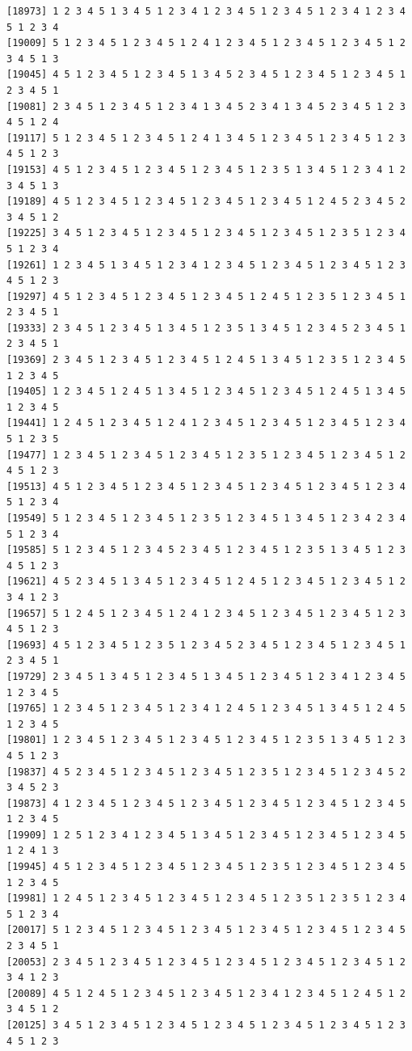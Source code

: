 \documentclass[
  english,
]{book}
\begin{document}
\begin{verbatim}
[18973] 1 2 3 4 5 1 3 4 5 1 2 3 4 1 2 3 4 5 1 2 3 4 5 1 2 3 4 1 2 3 4 5 1 2 3 4
[19009] 5 1 2 3 4 5 1 2 3 4 5 1 2 4 1 2 3 4 5 1 2 3 4 5 1 2 3 4 5 1 2 3 4 5 1 3
[19045] 4 5 1 2 3 4 5 1 2 3 4 5 1 3 4 5 2 3 4 5 1 2 3 4 5 1 2 3 4 5 1 2 3 4 5 1
[19081] 2 3 4 5 1 2 3 4 5 1 2 3 4 1 3 4 5 2 3 4 1 3 4 5 2 3 4 5 1 2 3 4 5 1 2 4
[19117] 5 1 2 3 4 5 1 2 3 4 5 1 2 4 1 3 4 5 1 2 3 4 5 1 2 3 4 5 1 2 3 4 5 1 2 3
[19153] 4 5 1 2 3 4 5 1 2 3 4 5 1 2 3 4 5 1 2 3 5 1 3 4 5 1 2 3 4 1 2 3 4 5 1 3
[19189] 4 5 1 2 3 4 5 1 2 3 4 5 1 2 3 4 5 1 2 3 4 5 1 2 4 5 2 3 4 5 2 3 4 5 1 2
[19225] 3 4 5 1 2 3 4 5 1 2 3 4 5 1 2 3 4 5 1 2 3 4 5 1 2 3 5 1 2 3 4 5 1 2 3 4
[19261] 1 2 3 4 5 1 3 4 5 1 2 3 4 1 2 3 4 5 1 2 3 4 5 1 2 3 4 5 1 2 3 4 5 1 2 3
[19297] 4 5 1 2 3 4 5 1 2 3 4 5 1 2 3 4 5 1 2 4 5 1 2 3 5 1 2 3 4 5 1 2 3 4 5 1
[19333] 2 3 4 5 1 2 3 4 5 1 3 4 5 1 2 3 5 1 3 4 5 1 2 3 4 5 2 3 4 5 1 2 3 4 5 1
[19369] 2 3 4 5 1 2 3 4 5 1 2 3 4 5 1 2 4 5 1 3 4 5 1 2 3 5 1 2 3 4 5 1 2 3 4 5
[19405] 1 2 3 4 5 1 2 4 5 1 3 4 5 1 2 3 4 5 1 2 3 4 5 1 2 4 5 1 3 4 5 1 2 3 4 5
[19441] 1 2 4 5 1 2 3 4 5 1 2 4 1 2 3 4 5 1 2 3 4 5 1 2 3 4 5 1 2 3 4 5 1 2 3 5
[19477] 1 2 3 4 5 1 2 3 4 5 1 2 3 4 5 1 2 3 5 1 2 3 4 5 1 2 3 4 5 1 2 4 5 1 2 3
[19513] 4 5 1 2 3 4 5 1 2 3 4 5 1 2 3 4 5 1 2 3 4 5 1 2 3 4 5 1 2 3 4 5 1 2 3 4
[19549] 5 1 2 3 4 5 1 2 3 4 5 1 2 3 5 1 2 3 4 5 1 3 4 5 1 2 3 4 2 3 4 5 1 2 3 4
[19585] 5 1 2 3 4 5 1 2 3 4 5 2 3 4 5 1 2 3 4 5 1 2 3 5 1 3 4 5 1 2 3 4 5 1 2 3
[19621] 4 5 2 3 4 5 1 3 4 5 1 2 3 4 5 1 2 4 5 1 2 3 4 5 1 2 3 4 5 1 2 3 4 1 2 3
[19657] 5 1 2 4 5 1 2 3 4 5 1 2 4 1 2 3 4 5 1 2 3 4 5 1 2 3 4 5 1 2 3 4 5 1 2 3
[19693] 4 5 1 2 3 4 5 1 2 3 5 1 2 3 4 5 2 3 4 5 1 2 3 4 5 1 2 3 4 5 1 2 3 4 5 1
[19729] 2 3 4 5 1 3 4 5 1 2 3 4 5 1 3 4 5 1 2 3 4 5 1 2 3 4 1 2 3 4 5 1 2 3 4 5
[19765] 1 2 3 4 5 1 2 3 4 5 1 2 3 4 1 2 4 5 1 2 3 4 5 1 3 4 5 1 2 4 5 1 2 3 4 5
[19801] 1 2 3 4 5 1 2 3 4 5 1 2 3 4 5 1 2 3 4 5 1 2 3 5 1 3 4 5 1 2 3 4 5 1 2 3
[19837] 4 5 2 3 4 5 1 2 3 4 5 1 2 3 4 5 1 2 3 5 1 2 3 4 5 1 2 3 4 5 2 3 4 5 2 3
[19873] 4 1 2 3 4 5 1 2 3 4 5 1 2 3 4 5 1 2 3 4 5 1 2 3 4 5 1 2 3 4 5 1 2 3 4 5
[19909] 1 2 5 1 2 3 4 1 2 3 4 5 1 3 4 5 1 2 3 4 5 1 2 3 4 5 1 2 3 4 5 1 2 4 1 3
[19945] 4 5 1 2 3 4 5 1 2 3 4 5 1 2 3 4 5 1 2 3 5 1 2 3 4 5 1 2 3 4 5 1 2 3 4 5
[19981] 1 2 4 5 1 2 3 4 5 1 2 3 4 5 1 2 3 4 5 1 2 3 5 1 2 3 5 1 2 3 4 5 1 2 3 4
[20017] 5 1 2 3 4 5 1 2 3 4 5 1 2 3 4 5 1 2 3 4 5 1 2 3 4 5 1 2 3 4 5 2 3 4 5 1
[20053] 2 3 4 5 1 2 3 4 5 1 2 3 4 5 1 2 3 4 5 1 2 3 4 5 1 2 3 4 5 1 2 3 4 1 2 3
[20089] 4 5 1 2 4 5 1 2 3 4 5 1 2 3 4 5 1 2 3 4 1 2 3 4 5 1 2 4 5 1 2 3 4 5 1 2
[20125] 3 4 5 1 2 3 4 5 1 2 3 4 5 1 2 3 4 5 1 2 3 4 5 1 2 3 4 5 1 2 3 4 5 1 2 3

\end{verbatim}
\end{document}
